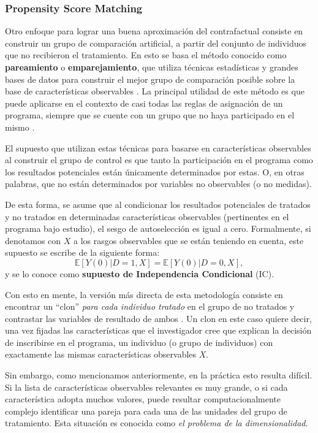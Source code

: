 \documentclass[../../main.tex]{subfiles}
\begin{document}
\subsubsection{Propensity Score Matching}
Otro enfoque para lograr una buena aproximación del contrafactual consiste en construir un
grupo de comparación artificial, a partir del conjunto de individuos que no recibieron el
tratamiento. En esto se basa el método conocido como \textbf{pareamiento} o
\textbf{emparejamiento}, que utiliza técnicas estadísticas y grandes bases de datos para
construir el mejor grupo de comparación posible sobre la base de características
observables \cite{gertler-2016}. La principal utilidad de este método es que puede
aplicarse en el contexto de casi todas las reglas de asignación de un programa, siempre
que se cuente con un grupo que no haya participado en el mismo \cite{gertler-2016}.

El supuesto que utilizan estas técnicas para basarse en características observables al
construir el grupo de control es que tanto la participación en el programa como los
resultados potenciales están únicamente determinados por estas. O, en otras palabras, que
no están determinados por variables no observables (o no medidas).

De esta forma, se asume que al condicionar los resultados potenciales de tratados y no
tratados en determinadas características observables (pertinentes en el programa bajo
estudio), el sesgo de autoselección es igual a cero. Formalmente, si denotamos con \(X\) a
los rasgos observables que se están teniendo en cuenta, este supuesto se escribe de la
siguiente forma\footnotemark :
\begin{equation}
    \mathbb{E}\left[Y(0)|D=1, X\right] = \mathbb{E}\left[Y(0)|D=0, X\right],
\end{equation}
y se lo conoce como \textbf{supuesto de Independencia Condicional} (IC).

Con esto en mente, la versión más directa de esta metodología consiste en encontrar un
``clon'' \textit{para cada individuo tratado} en el grupo de no tratados y contrastar las
variables de resultado de ambos \cite{bernal}. Un clon en este caso quiere decir, una vez
fijadas las características que el investigador cree que explican la decisión de
inscribirse en el programa, un individuo (o grupo de individuos) con exactamente las
mismas características observables \(X\).

Sin embargo, como mencionamos anteriormente, en la práctica esto resulta difícil. Si la
lista de características observables relevantes es muy grande, o si cada característica
adopta muchos valores, puede resultar computacionalmente complejo identificar una pareja
para cada una de las unidades del grupo de tratamiento. Esta situación es conocida como
\textit{el problema de la dimensionalidad}.
\end{document}
